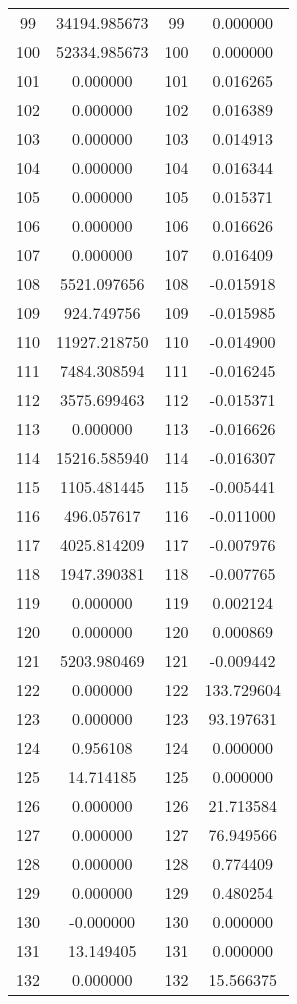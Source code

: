 \documentclass[12pt]{article}
\begin{document}
\begin{longtable}{@{}cccc@{}}
99 & 34194.985673 & 99 & 0.000000 \\
100 & 52334.985673 & 100 & 0.000000 \\
101 & 0.000000 & 101 & 0.016265 \\
102 & 0.000000 & 102 & 0.016389 \\
103 & 0.000000 & 103 & 0.014913 \\
104 & 0.000000 & 104 & 0.016344 \\
105 & 0.000000 & 105 & 0.015371 \\
106 & 0.000000 & 106 & 0.016626 \\
107 & 0.000000 & 107 & 0.016409 \\
108 & 5521.097656 & 108 & -0.015918 \\
109 & 924.749756 & 109 & -0.015985 \\
110 & 11927.218750 & 110 & -0.014900 \\
111 & 7484.308594 & 111 & -0.016245 \\
112 & 3575.699463 & 112 & -0.015371 \\
113 & 0.000000 & 113 & -0.016626 \\
114 & 15216.585940 & 114 & -0.016307 \\
115 & 1105.481445 & 115 & -0.005441 \\
116 & 496.057617 & 116 & -0.011000 \\
117 & 4025.814209 & 117 & -0.007976 \\
118 & 1947.390381 & 118 & -0.007765 \\
119 & 0.000000 & 119 & 0.002124 \\
120 & 0.000000 & 120 & 0.000869 \\
121 & 5203.980469 & 121 & -0.009442 \\
122 & 0.000000 & 122 & 133.729604 \\
123 & 0.000000 & 123 & 93.197631 \\
124 & 0.956108 & 124 & 0.000000 \\
125 & 14.714185 & 125 & 0.000000 \\
126 & 0.000000 & 126 & 21.713584 \\
127 & 0.000000 & 127 & 76.949566 \\
128 & 0.000000 & 128 & 0.774409 \\
129 & 0.000000 & 129 & 0.480254 \\
130 & -0.000000 & 130 & 0.000000 \\
131 & 13.149405 & 131 & 0.000000 \\
132 & 0.000000 & 132 & 15.566375 \\

\end{longtable}
\end{document}
